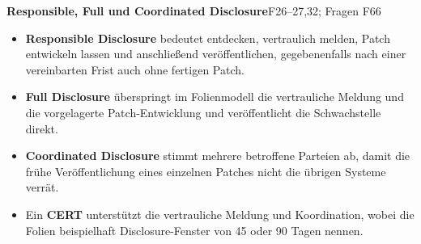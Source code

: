 \documentclass[11pt,a4paper]{article}
\newcommand{\block}[2]{\par\vspace{5pt}\textbf{#1}\hfill{\scriptsize #2}\par\nopagebreak}
\begin{document}
\block{Responsible, Full und Coordinated Disclosure}{F26--27,32; Fragen F66}
\begin{itemize}
\item \textbf{Responsible Disclosure} bedeutet entdecken, vertraulich melden, Patch entwickeln lassen und anschließend veröffentlichen, gegebenenfalls nach einer vereinbarten Frist auch ohne fertigen Patch.
\item \textbf{Full Disclosure} überspringt im Folienmodell die vertrauliche Meldung und die vorgelagerte Patch-Entwicklung und veröffentlicht die Schwachstelle direkt.
\item \textbf{Coordinated Disclosure} stimmt mehrere betroffene Parteien ab, damit die frühe Veröffentlichung eines einzelnen Patches nicht die übrigen Systeme verrät.
\item Ein \textbf{CERT} unterstützt die vertrauliche Meldung und Koordination, wobei die Folien beispielhaft Disclosure-Fenster von 45 oder 90 Tagen nennen.
\end{itemize}

\newpage
\end{document}
